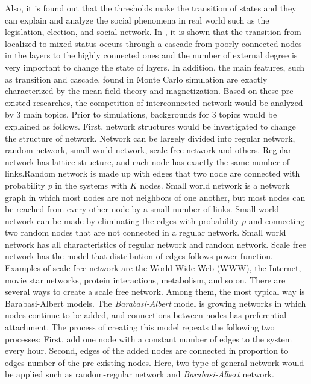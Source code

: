Also, it is found out that the thresholds make the transition of states and they can explain and analyze the social phenomena in real world such as the legislation, election, and social network.\parencite{alvarez2016, amato2017, diep2017} In \parencite{gomez2015}, it is shown that the transition from localized to mixed status occurs through a cascade from poorly connected nodes in the layers to the highly connected ones and the number of external degree is very important to change the state of layers.\parencite{gomez2015} In addition, the main features, such as transition and cascade, found in Monte Carlo simulation are exactly characterized by the mean-field theory and magnetization\parencite{alvarez2016, diep2017, amato2017, gomez2015}. 
Based on these pre-existed researches, the competition of interconnected network would be analyzed by 3 main topics. Prior to simulations, backgrounds for 3 topics would be explained as follows. 
First,  network structures would be investigated to change the structure of network. Network can be largely divided into regular network, random network\parencite{erdos1960}, small world network\parencite{watts1998}, scale free network\parencite{barabasi1999} and others. Regular network has lattice structure, and  each node has exactly the same number of links.Random network is made up with edges that two node are connected with probability $p$ in the systems with $K$ nodes. 
Small world network is a network graph in which most nodes are not neighbors of one another, but most nodes can be reached from every other node by a small number of links. Small world network can be made by eliminating the edges with probability $p$ and connecting two random nodes that are not connected in a regular network. Small world network has all characteristics of regular network and random network.
Scale free network has the model that distribution of edges follows power function. Examples of scale free network are the World Wide Web (WWW), the Internet, movie star networks, protein interactions, metabolism, and so on.
There are several ways to create a scale free network. Among them, the most typical way is Barabasi-Albert models.
The \textit{Barabasi-Albert} model is growing networks in which nodes continue to be added, and connections between nodes has preferential attachment. The process of creating this model repeats the following two processes: First, add one node with a constant number of edges to the system every hour. Second, edges of the added nodes are connected in proportion to edges number of the pre-existing nodes.
Here, two type of general network would be applied such as random-regular network and \textit{Barabasi-Albert} network. 

